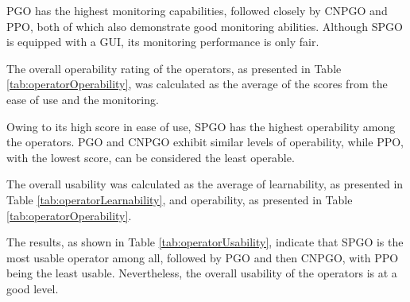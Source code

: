 PGO has the highest monitoring capabilities, followed closely by CNPGO and PPO, both of which also demonstrate good monitoring abilities. Although SPGO is equipped with a GUI, its monitoring performance is only fair.



The overall operability rating of the operators, as presented in Table \ref{tab:operatorOperability}, was calculated as the average of the scores from the ease of use and the monitoring.

Owing to its high score in ease of use, SPGO has the highest operability among the operators. PGO and CNPGO exhibit similar levels of operability, while PPO, with the lowest score, can be considered the least operable.


The overall usability was calculated as the average of learnability, as presented in Table \ref{tab:operatorLearnability}, and operability, as presented in Table \ref{tab:operatorOperability}.

The results, as shown in Table \ref{tab:operatorUsability}, indicate that SPGO is the most usable operator among all, followed by PGO and then CNPGO, with PPO being the least usable.
Nevertheless, the overall usability of the operators is at a good level.




